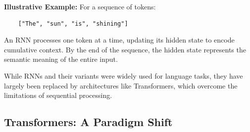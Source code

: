\begin{flushleft}
    \textbf{Illustrative Example:}
    For a sequence of tokens:
    \begin{verbatim}
    ["The", "sun", "is", "shining"]
    \end{verbatim}
    An RNN processes one token at a time, updating its hidden state to encode cumulative context. By the end of the sequence, the hidden state represents the semantic meaning of the entire input.

    While RNNs and their variants were widely used for language tasks, they have largely been replaced by architectures like Transformers, which overcome the limitations of sequential processing.
\end{flushleft}


\subsection{Transformers: A Paradigm Shift}

